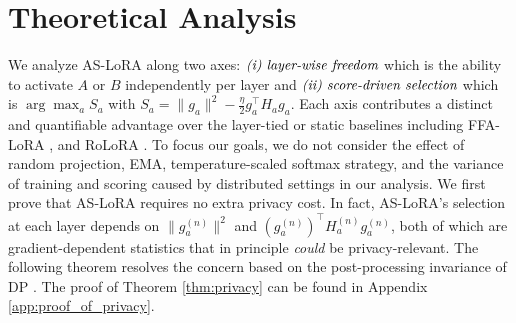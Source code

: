 \vspace{-3mm}

\section{Theoretical Analysis}\label{sec:theory}
We analyze AS-LoRA along two axes: $\emph{(i) layer-wise freedom}$ which is the ability to activate $A$ or $B$ independently per layer and $\emph{(ii) score-driven selection}$ which is  $\arg\max_a S_a$ with $S_a=\|g_a\|^2-\tfrac{\eta}{2}g_a^\top H_a g_a$. Each axis contributes a distinct and quantifiable advantage over the layer-tied or static baselines including FFA-LoRA \cite{sun2024improving}, and RoLoRA \cite{chen2025robust}. To focus our goals, we do not consider the effect of random projection, EMA, temperature-scaled softmax strategy, and the variance of training and scoring caused by distributed settings in our analysis. We first prove that AS-LoRA requires no extra privacy cost. In fact, AS-LoRA's selection at each layer depends on $\|g_a^{(n)}\|^2$ and $(g_a^{(n)})^\top H_a^{(n)} g_a^{(n)}$, both of which are gradient-dependent statistics that in principle \emph{could} be privacy-relevant. The following theorem resolves the concern based on the post-processing invariance of DP \cite{dwork2014dpfoundations}. The proof of Theorem \ref{thm:privacy} can be found in Appendix \ref{app:proof_of_privacy}.

